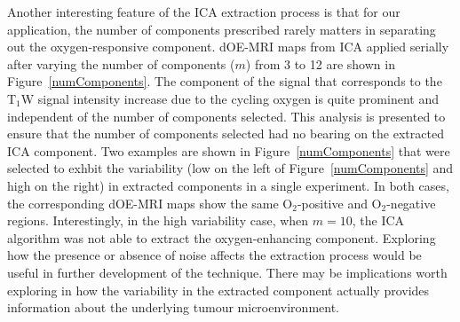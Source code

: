 \label{sec:numComponents}
Another interesting feature of the \acs{ICA} extraction process is that for our application, the number of components prescribed rarely matters in separating out the oxygen-responsive component.
\acs{dOE-MRI} maps from \acs{ICA} applied serially after varying the number of components ($m$) from 3 to 12 are shown in Figure~\ref{numComponents}.
The component of the signal that corresponds to the T$_1$W signal intensity increase due to the cycling oxygen is quite prominent and independent of the number of components selected.
This analysis is presented to ensure that the number of components selected had no bearing on the extracted ICA component.
Two examples are shown in Figure~\ref{numComponents} that were selected to exhbit the variability (low on the left of Figure~\ref{numComponents} and high on the right) in extracted components in a single experiment.
In both cases, the corresponding \acs{dOE-MRI} maps show the same O$_2$-positive and O$_2$-negative regions.
Interestingly, in the high variability case, when $m = 10$, the ICA algorithm was not able to extract the oxygen-enhancing component.
Exploring how the presence or absence of noise affects the extraction process would be useful in further development of the technique.
There may be implications worth exploring in how the variability in the extracted component actually provides information about the underlying tumour microenvironment.

